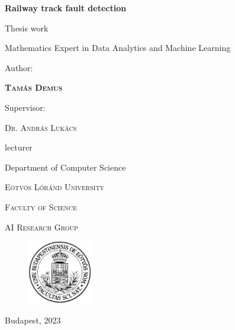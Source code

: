 \thispagestyle{empty}
\begin{center}
    \vspace*{1cm}

    {\Huge\textbf{Railway track fault detection}}

    \vspace*{2cm}

    {\Large Thesis work}

    \vspace*{5pt}

    Mathematics Expert in Data Analytics and Machine Learning

    \vspace*{3cm}

    Author:

    \vspace*{5pt}

    {\Large\textbf{\textsc{Tamás Demus}}}

    \vspace*{2cm}

    Supervisor:

    \vspace*{5pt}

    {\Large\textsc{Dr. András Lukács}}

    \vspace*{5pt}

    lecturer

    Department of Computer Science

    \vspace*{\fill}

    \textsc{Eötvös Lóránd University}

    \textsc{Faculty of Science}

    \textsc{AI Research Group}

    \begin{figure}[H]
        \centering
        \includegraphics[width=0.25\textwidth]{./tex_images/elte_logo.png}
    \end{figure}

    Budapest, 2023
\end{center}
\newpage